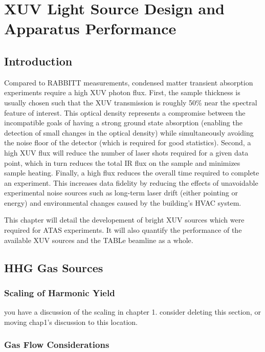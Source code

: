\chapter{XUV Light Source Design and Apparatus Performance}

\section{Introduction}

Compared to RABBITT measurements, condensed matter transient absorption experiments require a high XUV photon flux. First, the sample thickness is usually chosen such that the XUV transmission is roughly 50\% near the spectral feature of interest. This optical density represents a compromise between the incompatible goals of having a strong ground state absorption (enabling the detection of small changes in the optical density) while simultaneously avoiding the noise floor of the detector (which is required for good statistics). Second, a high XUV flux will reduce the number of laser shots required for a given data point, which in turn reduces the total IR flux on the sample and minimizes sample heating. Finally, a high flux reduces the overall time required to complete an experiment. This increases data fidelity by reducing the effects of unavoidable experimental noise sources such as long-term laser drift (either pointing or energy) and environmental changes caused by the building's HVAC system.

This chapter will detail the developement of bright XUV sources which were required for ATAS experiments. It will also quantify the performance of the available XUV sources and the TABLe beamline as a whole.

\section{HHG Gas Sources}
\label{sec:HHG_gas_sources}

\subsection{Scaling of Harmonic Yield}

you have a discussion of the scaling in chapter 1. consider deleting this section, or moving chap1's discussion to this location.

\subsection{Gas Flow Considerations}

